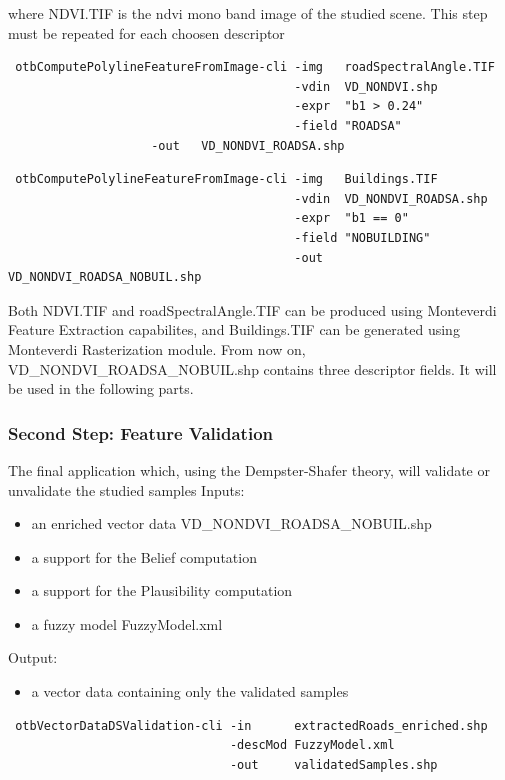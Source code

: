 where NDVI.TIF is the ndvi mono band image of the studied scene.
This step must be repeated for each choosen descriptor

\begin{verbatim}
 otbComputePolylineFeatureFromImage-cli -img   roadSpectralAngle.TIF  
                                        -vdin  VD_NONDVI.shp 
                                        -expr  "b1 > 0.24"
                                        -field "ROADSA" 
					-out   VD_NONDVI_ROADSA.shp
\end{verbatim}

\begin{verbatim}
 otbComputePolylineFeatureFromImage-cli -img   Buildings.TIF 
                                        -vdin  VD_NONDVI_ROADSA.shp 
                                        -expr  "b1 == 0" 
                                        -field "NOBUILDING" 
                                        -out   VD_NONDVI_ROADSA_NOBUIL.shp
\end{verbatim}

Both NDVI.TIF and roadSpectralAngle.TIF can be produced using Monteverdi Feature Extraction capabilites, and Buildings.TIF can be generated using Monteverdi Rasterization module.
From now on, VD\_NONDVI\_ROADSA\_NOBUIL.shp contains three descriptor fields. It will be used in the following parts.

\subsubsection{Second Step: Feature Validation}

The final application which, using the Dempster-Shafer theory, will validate or unvalidate the studied samples
Inputs:
\begin{itemize}
\item an enriched vector data VD\_NONDVI\_ROADSA\_NOBUIL.shp
\item a support for the Belief computation
\item a support for the Plausibility computation
\item a fuzzy model FuzzyModel.xml
\end{itemize}
Output:
\begin{itemize}
\item a vector data containing only the validated samples
\end{itemize}
\begin{verbatim}
 otbVectorDataDSValidation-cli -in      extractedRoads_enriched.shp 
                               -descMod FuzzyModel.xml 
                               -out     validatedSamples.shp
\end{verbatim}

